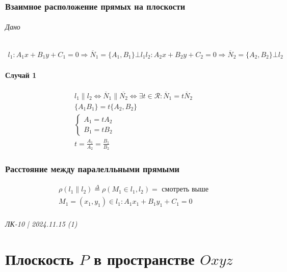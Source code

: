 \documentclass{article}
\begin{document}
\section{Взаимное расположение прямых на плоскости}
\paragraph{Дано}
\begin{gather*}
    l_1: A_1x + B_1y + C_1 = 0 \Rightarrow \overline{N}_1 = \{A_1, B_1\} \bot l_1
    l_2: A_2x + B_2y + C_2 = 0 \Rightarrow \overline{N}_2 = \{A_2, B_2\} \bot l_2
\end{gather*}

\subsection{Случай 1}
\begin{gather*}
    l_1 \parallel l_2 \Leftrightarrow \overline{N}_1 \parallel \overline{N_2} \Leftrightarrow \exists t \in \mathcal{R}: \overline{N}_1 = t\overline{N}_2 \\
    \{A_1 B_1\} = t\{A_2, B_2\} \\
    \begin{cases}
        A_1 = tA_2 \\
        B_1 = tB_2
    \end{cases} \\
    t = \frac{A_1}{A_2} = \frac{B_1}{B_2}
\end{gather*}

\section{Расстояние между паралелльными прямыми}
\begin{gather*}
    \rho(l_1 \parallel l_2) \overset{\Delta}{=} \rho(M_1 \in l_1, l_2) = \text{ смотреть выше} \\
    M_1 = (x_1, y_1) \in l_1: A_1x_1 + B_1y_1 + C_1 = 0
\end{gather*}





\newpage
\paragraph{ЛК-10 | 2024.11.15 (1)}
\part{Плоскость $P$ в пространстве $Oxyz$}
\end{document}

